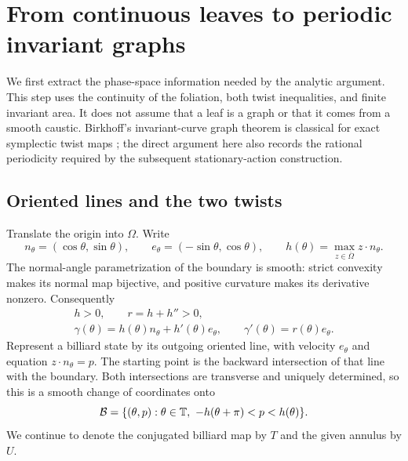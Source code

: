 \section{From continuous leaves to periodic invariant graphs}
\label{sec:geometry}

We first extract the phase-space information needed by the analytic
argument.  This step uses the continuity of the foliation, both twist
inequalities, and finite invariant area.  It does not assume that a leaf
is a graph or that it comes from a smooth caustic. Birkhoff's
invariant-curve graph theorem is classical for exact symplectic twist maps
\citep{Arnaud2009}; the direct argument here also records the rational
periodicity required by the subsequent stationary-action construction.

\subsection{Oriented lines and the two twists}

Translate the origin into $\Omega$.  Write
\[
 n_\theta=(\cos\theta,\sin\theta),\qquad
 e_\theta=(-\sin\theta,\cos\theta),\qquad
 h(\theta)=\max_{z\in\overline\Omega}z\cdot n_\theta.
\]
The normal-angle parametrization of the boundary is smooth: strict
convexity makes its normal map bijective, and positive curvature makes
its derivative nonzero.  Consequently
\begin{equation}\label{geo:support}
 \begin{gathered}
 h>0,\qquad r=h+h''>0,\\
 \gamma(\theta)=h(\theta)n_\theta+h'(\theta)e_\theta,
 \qquad \gamma'(\theta)=r(\theta)e_\theta.
 \end{gathered}
\end{equation}
Represent a billiard state by its outgoing oriented line, with velocity
$e_\theta$ and equation $z\cdot n_\theta=p$.  The starting point is the
backward intersection of that line with the boundary.  Both intersections
are transverse and uniquely determined, so this is a smooth change of
coordinates onto
\[
 \mathcal B=\{(\theta,p):\theta\in\mathbb{T},
                  \ -h(\theta+\pi)<p<h(\theta)\}.
\]
We continue to denote the conjugated billiard map by $T$ and the given
annulus by $U$.

